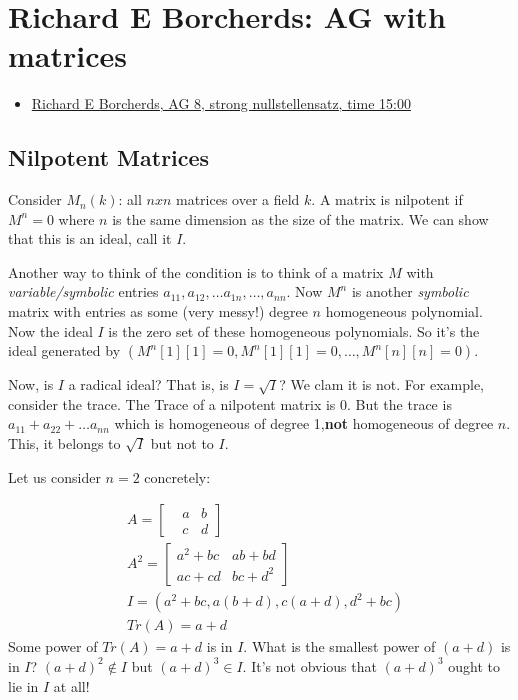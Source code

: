 \documentclass{book}
\theoremstyle{definition}
\begin{document}
\tableofcontents


\chapter{Richard E Borcherds: AG with matrices}
\begin{itemize}
\item \href{https://www.youtube.com/watch?v=1UvW5iTkbLw&feature=youtu.be&t=819}{Richard E Borcherds, AG 8, strong nullstellensatz, time 15:00}
\end{itemize}

\section{Nilpotent Matrices}
Consider $M_n(k)$: all $nxn$ matrices over a field $k$. A matrix
is nilpotent if $M^n = 0$ where $n$ is the same dimension as the size
of the matrix. We can show that this is an ideal, call it $I$.

Another way to think of the condition is to think of a matrix $M$ with
\emph{variable/symbolic} entries $a_{11}, a_{12}, \dots a_{1n}, \dots, a_{nn}$. 
Now $M^n$ is another \emph{symbolic} matrix with entries as some (very messy!) degree $n$
homogeneous polynomial. Now the ideal $I$ is the zero set of these homogeneous
polynomials. So it's the ideal generated by $(M^n[1][1] = 0, M^n[1][1] = 0, \dots, M^n[n][n] = 0)$.


Now, is $I$ a radical ideal? That is, is $I = \sqrt{I}$? We clam it is not.
For example, consider the trace. The Trace of a nilpotent matrix is 0.
But the trace is $a_{11} + a_{22} + \dots a_{nn}$ which is homogeneous
of degree 1,\textbf{not} homogeneous of degree $n$. This, it belongs to
$\sqrt{I}$ but not to $I$.

Let us consider $n = 2$ concretely:

\begin{align*}
&A = \begin{bmatrix} 
&     a & b \\
&     c & d \end{bmatrix} \\
&A^2 = \begin{bmatrix} a^2 + bc & ab + bd \\ ac + cd & bc + d^2 \end{bmatrix} \\
&I = (a^2 + bc, a(b+d), c(a+d), d^2 + bc) \\
&Tr(A) = a + d
\end{align*}
Some power of $Tr(A) = a + d$ is in $I$. What is the smallest power of $(a+d)$
is in $I$? $(a+d)^2 \not \in I$ but $(a+d)^3 \in I$. It's not obvious that
$(a+d)^3$ ought to lie in $I$ at all!
\end{document}
